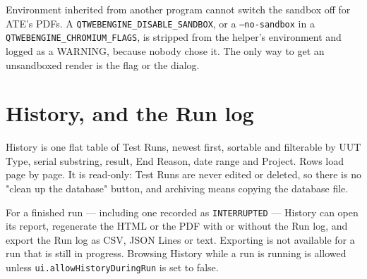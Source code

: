 Environment inherited from another program cannot switch the sandbox off for ATE's PDFs. A
\texttt{QTWEBENGINE\_}\allowbreak\texttt{DISABLE\_SANDBOX}, or a \texttt{--no-sandbox} in a
\texttt{QTWEBENGINE\_}\allowbreak\texttt{CHROMIUM\_FLAGS}, is stripped from the helper's environment
and logged as a WARNING, because nobody chose it. The only way to get an unsandboxed render is the
flag or the dialog.

\section{History, and the Run log}

History is one flat table of Test Runs, newest first, sortable and filterable by UUT Type, serial
substring, result, End Reason, date range and Project. Rows load page by page. It is read-only:
Test Runs are never edited or deleted, so there is no "clean up the database" button, and archiving
means copying the database file.

For a finished run --- including one recorded as \texttt{INTERRUPTED} --- History can open its
report, regenerate the HTML or the PDF with or without the Run log, and export the Run log as CSV,
JSON Lines or text. Exporting is not available for a run that is still in progress. Browsing
History while a run is running is allowed unless \texttt{ui.allowHistoryDuringRun} is set to false.

